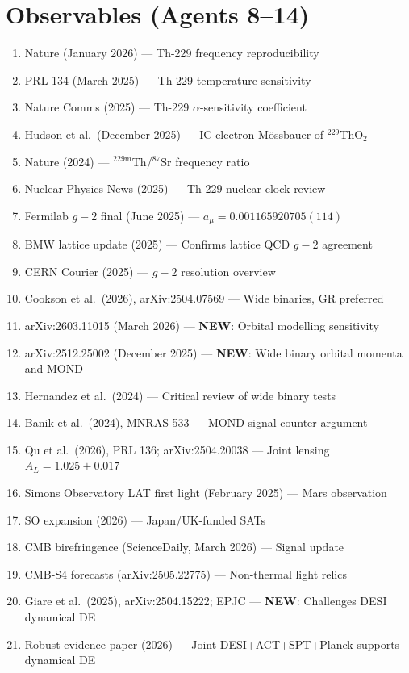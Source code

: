 \documentclass[11pt,a4paper]{article}
\newcommand{\NEW}{\textcolor{dfdblue}{\textbf{NEW}}}
\begin{document}
\section{Observables (Agents 8--14)}

\begin{enumerate}
\item Nature (January 2026) --- Th-229 frequency reproducibility
\item PRL 134 (March 2025) --- Th-229 temperature sensitivity
\item Nature Comms (2025) --- Th-229 $\alpha$-sensitivity coefficient
\item Hudson et al.\ (December 2025) --- IC electron M\"ossbauer of $^{229}$ThO$_2$
\item Nature (2024) --- $^{229\text{m}}$Th/$^{87}$Sr frequency ratio
\item Nuclear Physics News (2025) --- Th-229 nuclear clock review
\item Fermilab $g-2$ final (June 2025) --- $a_\mu = 0.001165920705(114)$
\item BMW lattice update (2025) --- Confirms lattice QCD $g-2$ agreement
\item CERN Courier (2025) --- $g-2$ resolution overview
\item Cookson et al.\ (2026), arXiv:2504.07569 --- Wide binaries, GR preferred
\item arXiv:2603.11015 (March 2026) --- \NEW: Orbital modelling sensitivity
\item arXiv:2512.25002 (December 2025) --- \NEW: Wide binary orbital momenta and MOND
\item Hernandez et al.\ (2024) --- Critical review of wide binary tests
\item Banik et al.\ (2024), MNRAS 533 --- MOND signal counter-argument
\item Qu et al.\ (2026), PRL 136; arXiv:2504.20038 --- Joint lensing $A_L = 1.025 \pm 0.017$
\item Simons Observatory LAT first light (February 2025) --- Mars observation
\item SO expansion (2026) --- Japan/UK-funded SATs
\item CMB birefringence (ScienceDaily, March 2026) --- Signal update
\item CMB-S4 forecasts (arXiv:2505.22775) --- Non-thermal light relics
\item Giare et al.\ (2025), arXiv:2504.15222; EPJC --- \NEW: Challenges DESI dynamical DE
\item Robust evidence paper (2026) --- Joint DESI+ACT+SPT+Planck supports dynamical DE

\end{enumerate}
\end{document}
